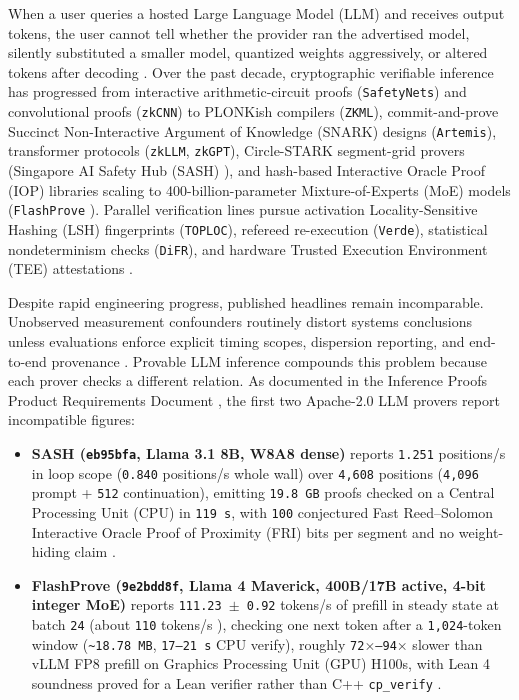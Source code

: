 \documentclass[11pt,letterpaper]{article}
\begin{document}
When a user queries a hosted Large Language Model (LLM) and receives output tokens, the user cannot tell whether the provider ran the advertised model, silently substituted a smaller model, quantized weights aggressively, or altered tokens after decoding \cite{rinberg2026flashprove}. Over the past decade, cryptographic verifiable inference has progressed from interactive arithmetic-circuit proofs (\texttt{SafetyNets}) and convolutional proofs (\texttt{zkCNN}) to PLONKish compilers (\texttt{ZKML}), commit-and-prove Succinct Non-Interactive Argument of Knowledge (SNARK) designs (\texttt{Artemis}), transformer protocols (\texttt{zkLLM}, \texttt{zkGPT}), Circle-STARK segment-grid provers (Singapore AI Safety Hub (SASH) \cite{sash2026}), and hash-based Interactive Oracle Proof (IOP) libraries scaling to 400-billion-parameter Mixture-of-Experts (MoE) models (\texttt{FlashProve} \cite{rinberg2026flashprove}). Parallel verification lines pursue activation Locality-Sensitive Hashing (LSH) fingerprints (\texttt{TOPLOC}), refereed re-execution (\texttt{Verde}), statistical nondeterminism checks (\texttt{DiFR}), and hardware Trusted Execution Environment (TEE) attestations \cite{iproofs2026}.

Despite rapid engineering progress, published headlines remain incomparable. Unobserved measurement confounders routinely distort systems conclusions unless evaluations enforce explicit timing scopes, dispersion reporting, and end-to-end provenance \cite{iproofs2026}. Provable LLM inference compounds this problem because each prover checks a different relation. As documented in the Inference Proofs Product Requirements Document \cite{iproofs2026}, the first two Apache-2.0 LLM provers report incompatible figures:

\begin{itemize}
\item \textbf{SASH (\texttt{eb95bfa}, Llama 3.1 8B, W8A8 dense)} reports \texttt{1.251} positions/s in loop scope (\texttt{0.840} positions/s whole wall) over \texttt{4,608} positions (\texttt{4,096} prompt + \texttt{512} continuation), emitting \texttt{19.8 GB} proofs checked on a Central Processing Unit (CPU) in \texttt{119 s}, with \texttt{100} conjectured Fast Reed--Solomon Interactive Oracle Proof of Proximity (FRI) bits per segment and no weight-hiding claim \cite{iproofs2026,sash2026}.
\item \textbf{FlashProve (\texttt{9e2bdd8f}, Llama 4 Maverick, 400B/17B active, 4-bit integer MoE)} reports \texttt{111.23 $\pm$ 0.92} tokens/s of prefill in steady state at batch \texttt{24} (about \texttt{110} tokens/s \cite{rinberg2026flashprove}), checking one next token after a \texttt{1,024}-token window (\texttt{\textasciitilde{}18.78 MB}, \texttt{17--21 s} CPU verify), roughly \texttt{72$\times$--94$\times$} slower than vLLM FP8 prefill on Graphics Processing Unit (GPU) H100s, with Lean 4 soundness proved for a Lean verifier rather than C++ \texttt{cp\_\allowbreak{}verify} \cite{rinberg2026flashprove,iproofs2026}.
\end{itemize}
\end{document}
